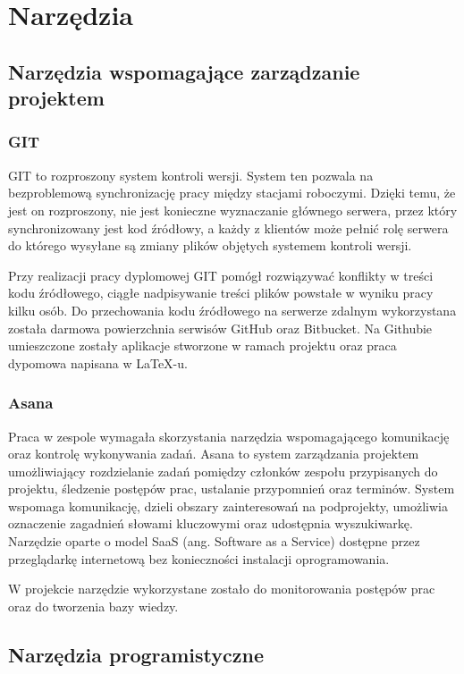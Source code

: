 \newpage
\section{Narzędzia}
\label{sec:tools}

\subsection{Narzędzia wspomagające zarządzanie projektem}

\subsubsection{GIT}
\label{sub:GIT}
GIT to rozproszony system kontroli wersji. System ten pozwala na bezproblemową synchronizację pracy między stacjami roboczymi. Dzięki temu, że jest on rozproszony, nie jest konieczne wyznaczanie głównego serwera, przez który synchronizowany jest kod źródłowy, a każdy z klientów może pełnić rolę serwera do którego wysyłane są zmiany plików objętych systemem kontroli wersji.

Przy realizacji pracy dyplomowej GIT pomógł rozwiązywać konflikty w treści kodu źródłowego, ciągłe nadpisywanie treści plików powstałe w wyniku pracy kilku osób. Do przechowania kodu źródłowego na serwerze zdalnym wykorzystana została darmowa powierzchnia serwisów GitHub oraz Bitbucket. Na Githubie umieszczone zostały aplikacje stworzone w ramach projektu oraz praca dypomowa napisana w LaTeX-u.


\subsubsection{Asana}
\label{sub:Asana}

Praca w zespole wymagała skorzystania narzędzia wspomagającego komunikację oraz kontrolę wykonywania zadań. Asana to system zarządzania projektem umożliwiający rozdzielanie zadań pomiędzy członków zespołu przypisanych do projektu, śledzenie postępów prac, ustalanie przypomnień oraz terminów. System wspomaga komunikację, dzieli obszary zainteresowań na podprojekty, umożliwia oznaczenie zagadnień słowami kluczowymi oraz udostępnia wyszukiwarkę. Narzędzie oparte o model SaaS (ang. Software as a Service) dostępne przez przeglądarkę internetową bez konieczności instalacji oprogramowania.

W projekcie narzędzie wykorzystane zostało do monitorowania postępów prac oraz do tworzenia bazy wiedzy.

\subsection{Narzędzia programistyczne}

